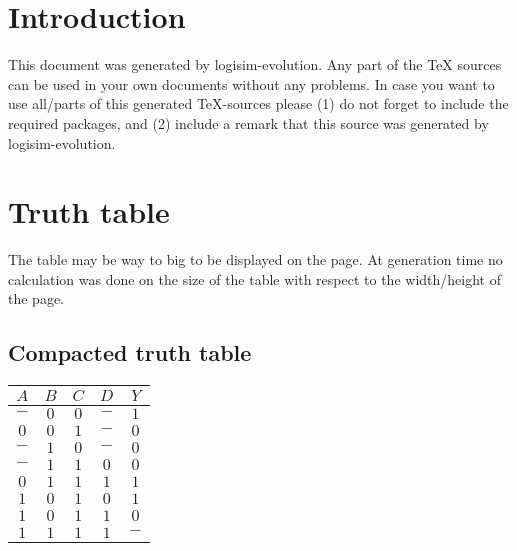 \documentclass [15pt,a4paper,twoside]{article}
\begin{document}
\section{Introduction}
This document was generated by logisim-evolution. Any part of the TeX sources can be used in your own documents without any problems. In case you want to use all/parts of this generated TeX-sources please (1) do not forget to include the required packages, and (2) include a remark that this source was generated by logisim-evolution.
\section{Truth table}
The table may be way to big to be displayed on the page. At generation time no calculation was done on the size of the table with respect to the width/height of the page.
\subsection{Compacted truth table}
\begin{center}
\begin{tabular}{cccc|c}
$A$&$B$&$C$&$D$&$Y$\\
\hline
$-$&$0$&$0$&$-$&$1$\\
$0$&$0$&$1$&$-$&$0$\\
$-$&$1$&$0$&$-$&$0$\\
$-$&$1$&$1$&$0$&$0$\\
$0$&$1$&$1$&$1$&$1$\\
$1$&$0$&$1$&$0$&$1$\\
$1$&$0$&$1$&$1$&$0$\\
$1$&$1$&$1$&$1$&$-$\\

\end{tabular}
\end{center}
\end{document}
